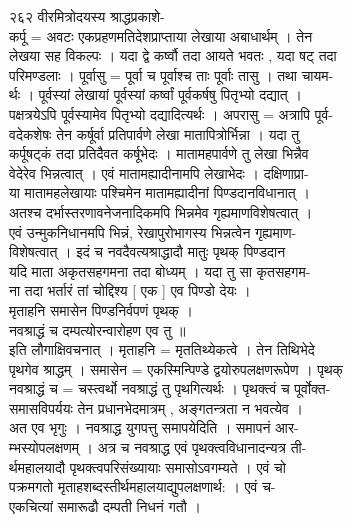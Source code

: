 \documentclass[11pt, openany]{book}
\begin{document}
{{{{{{{{{{{{{{{{{{{{{{{{{{{{{{{{{{{{{{{{{{{{{{{{{{{{{{{{{{{{{{{२६२ वीरमित्रोदयस्य श्राद्धप्रकाशे-}{\\
कर्पू = अवटः एकप्रहणमतिदेशप्राप्ताया लेखाया अबाधार्थम् । तेन\\
लेखया सह विकल्पः । यदा द्वे कर्ष्वौ तदा आयते भवतः , यदा षट् तदा\\
परिमण्डलाः । पूर्वासु = पूर्वा च पूर्वाश्च ताः पूर्वाः तासु । तथा
चायम-\\
र्थः । पूर्वस्यां लेखायां पूर्वस्यां कर्ष्वां पूर्वकर्षषु पितृभ्यो
दद्यात् ।\\
पक्षत्रयेऽपि पूर्वस्यामेव पितृभ्यो दद्यादित्यर्थः । अपरासु = अत्रापि
पूर्व-\\
वदेकशेषः तेन कर्षूर्वा प्रतिपार्वणे लेखा मातापित्रोर्भिन्ना । यदा तु\\
कर्पूषट्कं तदा प्रतिदैवत कर्षूभेदः । मातामहपार्वणे तु लेखा भिन्नैव\\
वेदेरेव भिन्नत्वात् । एवं मातामह्यादीनामपि लेखाभेदः । दक्षिणाप्रा-\\
या मातामहलेखायाः पश्चिमेन मातामह्यादीनां पिण्डदानविधानात् ।\\
अतश्च दर्भास्तरणावनेजनादिकमपि भिन्नमेव गृह्यमाणविशेषत्वात् ।\\
एवं उन्मुकनिधानमपि भिन्नं, रेखापुरोभागस्य भिन्नत्वेन गृह्यमाण-\\
विशेषत्वात् । इदं च नवदैवत्यश्राद्धादौ मातुः पृथक् पिण्डदान\\
यदि माता अकृतसहगमना तदा बोध्यम् । यदा तु सा कृतसहगम-\\
ना तदा भर्तारं तां चोद्दिश्य {[} एक {]} एव पिण्डो देयः ।\\
मृताहनि समासेन पिण्डनिर्वपणं पृथक् ।\\
नवश्राद्धं च दम्पत्योरन्वारोहण एव तु ॥\\
इति लौगाक्षिवचनात् । मृताहनि = मृततिथ्येकत्वे । तेन तिथिभेदे\\
पृथगेव श्राद्धम् । समासेन = एकस्मिन्पिण्डे द्वयोरुपलक्षणरूपेण । पृथक्\\
नवश्राद्धं च = चस्त्वर्थो नवश्राद्धं तु पृथगित्यर्थः । पृथक्त्वं च
पूर्वोक्त-\\
समासविपर्ययः तेन प्रधानभेदमात्रम् , अङ्गतन्त्रता न भवत्येव ।\\
अत एव भृगुः । नवश्राद्ध युगपत्तु समापयेदिति । समापनं आर-\\
म्भस्योपलक्षणम् । अत्र च नवश्राद्ध एवं पृथक्त्वविधानादन्यत्र ती-\\
र्थमहालयादौ पृथक्त्वपरिसंख्यायाः समासोऽवगम्यते । एवं चो\\
पक्रमगतो मृताहशब्दस्तीर्थमहालयाद्युपलक्षणार्थ: । एवं च-\\
एकचित्यां समारूढौ दम्पती निधनं गतौ ।\\
}}}}}}}}}}}}}}}}}}}}}}}}}}}}}}}}}}}}}}}}}}}}}}}}}}}}}}}}}}}}}}}
\end{document}
